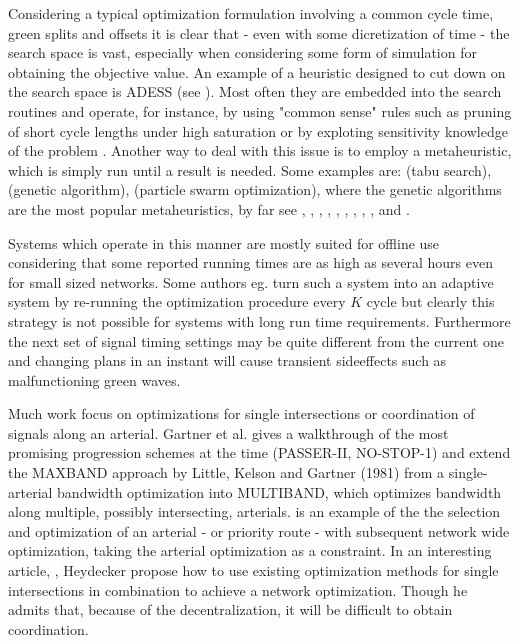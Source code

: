Considering a typical optimization formulation involving a common cycle time, green splits and offsets it is clear that - even with some dicretization of time - the search space is vast, especially when considering some form of simulation for obtaining the objective value. An example of a heuristic designed to cut down on the search space is ADESS (see \cite{26}). Most often they are embedded into the search routines and operate, for instance, by using "common sense" rules such as pruning of short cycle lengths under high saturation or by exploting sensitivity knowledge of the problem \cite{40}.
Another way to deal with this issue is to employ a metaheuristic, which is simply run until a result is needed. Some examples are: \cite{1} (tabu search), \cite{7} (genetic algorithm), \cite{42} (particle swarm optimization), where the genetic algorithms are the most popular metaheuristics, by far see \cite{13}, \cite{4}, \cite{33}, \cite{43}, \cite{7}, \cite{41}, \cite{31}, \cite{13}, \cite{27}, \cite{2} and \cite{26}.

Systems which operate in this manner are mostly suited for offline use considering that some reported running times are as high as several hours even for small sized networks.
Some authors eg. \cite{16} turn such a system into an adaptive system by re-running the optimization procedure every $K$ cycle but clearly this strategy is not possible for systems with long run time requirements. Furthermore the next set of signal timing settings may be quite different from the current one and changing plans in an instant will cause transient sideeffects such as malfunctioning green waves.

Much work focus on optimizations for single intersections or coordination of signals along an arterial. Gartner et al. \cite{9} gives a walkthrough of the most promising progression schemes at the time (PASSER-II, NO-STOP-1) and extend the MAXBAND approach by Little, Kelson and Gartner (1981) from a single-arterial bandwidth optimization into MULTIBAND, which optimizes bandwidth along multiple, possibly intersecting, arterials. \cite{6} is an example of the the selection and optimization of an arterial - or priority route - with subsequent network wide optimization, taking the arterial optimization as a constraint.
In an interesting article, \cite{24}, Heydecker propose how to use existing optimization methods for single intersections in combination to achieve a network optimization. Though he admits that, because of the decentralization, it will be difficult to obtain coordination.